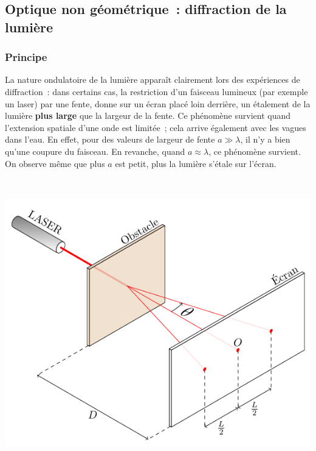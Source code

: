 \documentclass[../../main/main.tex]{subfiles}
\begin{document}
\subsection{Optique non géométrique~: diffraction de la lumière}
\subsubsection{Principe}

\noindent
\begin{minipage}[t]{.48\linewidth}
	La nature ondulatoire de la lumière apparaît clairement lors des expériences de
	diffraction~: dans certains cas, la restriction d'un faisceau lumineux (par
	exemple un laser) par une fente, donne sur un écran placé loin derrière, un
	étalement de la lumière \textbf{plus large} que la largeur de la fente.
	\smallbreak
	Ce phénomène survient quand l'extension spatiale d'une onde est limitée~; cela
	arrive également avec les vagues dans l'eau. En effet, pour des valeurs de
	largeur de fente $a \gg \lambda$, il n'y a bien qu'une coupure du faisceau. En
	revanche, quand $a \approx \lambda$, ce phénomène survient. On observe même que
	plus $a$ est petit, plus la lumière s'étale sur l'écran.
\end{minipage}
\hfill
\begin{minipage}[t]{.48\linewidth}
	~
	\vspace*{-30pt}
	\begin{center}
		\includegraphics[width=.8\linewidth]{diffraction}
		\label{fig:diff_las}
	\end{center}
\end{minipage}
\end{document}
